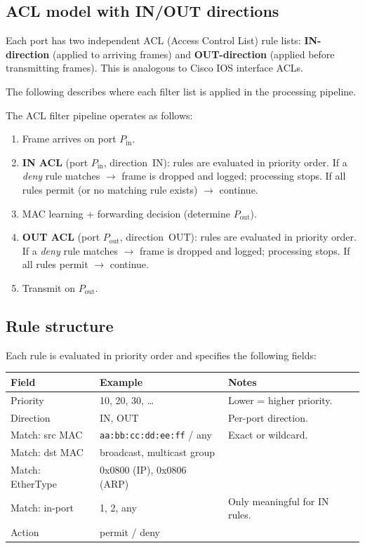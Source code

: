 \documentclass[12pt,a4paper]{article}
\begin{document}
\subsection{ACL model with IN/OUT directions}

Each port has two independent ACL (Access Control List) rule lists:
\textbf{IN-direction} (applied to arriving frames) and
\textbf{OUT-direction} (applied before transmitting frames).
This is analogous to Cisco IOS interface ACLs.

The following describes where each filter list is applied in the
processing pipeline.

The ACL filter pipeline operates as follows:

\begin{enumerate}[noitemsep]
  \item Frame arrives on port $P_{\mathrm{in}}$.
  \item \textbf{IN ACL} (port $P_{\mathrm{in}}$, direction~IN):
        rules are evaluated in priority order.
        If a \emph{deny} rule matches $\to$ frame is dropped and logged;
        processing stops.
        If all rules permit (or no matching rule exists) $\to$ continue.
  \item MAC learning + forwarding decision (determine $P_{\mathrm{out}}$).
  \item \textbf{OUT ACL} (port $P_{\mathrm{out}}$, direction~OUT):
        rules are evaluated in priority order.
        If a \emph{deny} rule matches $\to$ frame is dropped and logged;
        processing stops.
        If all rules permit $\to$ continue.
  \item Transmit on $P_{\mathrm{out}}$.
\end{enumerate}

\subsection{Rule structure}

Each rule is evaluated in priority order and specifies the following fields:

\begin{center}
\begin{tabular}{lll}
\toprule
\textbf{Field}   & \textbf{Example}                   & \textbf{Notes} \\
\midrule
Priority         & 10, 20, 30, \ldots                 & Lower = higher priority. \\
Direction        & IN, OUT                            & Per-port direction. \\
Match: src MAC   & \texttt{aa:bb:cc:dd:ee:ff} / any   & Exact or wildcard. \\
Match: dst MAC   & broadcast, multicast group          & \\
Match: EtherType & 0x0800 (IP), 0x0806 (ARP)           & \\
Match: in-port   & 1, 2, any                           & Only meaningful for IN rules. \\
Action           & permit / deny                       & \\
\bottomrule
\end{tabular}
\end{center}
\end{document}

